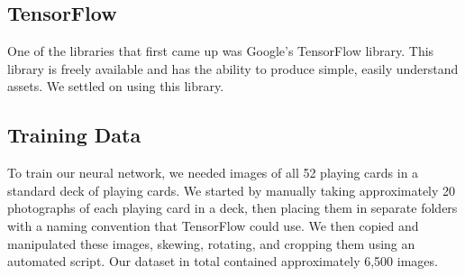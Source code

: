 \documentclass[letterpaper]{article}
\begin{document}
\subsection{TensorFlow}
One of the libraries that first came up was Google's TensorFlow library.  This library is freely available and has the ability to produce simple, easily understand assets.  We settled on using this library.

\subsection{Training Data}
To train our neural network, we needed images of all 52 playing cards in a standard deck of playing cards.  We started by manually taking approximately 20 photographs of each playing card in a deck, then placing them in separate folders with a naming convention that TensorFlow could use.  We then copied and manipulated these images, skewing, rotating, and cropping them using an automated script. Our dataset in total contained approximately 6,500 images.
\end{document}
